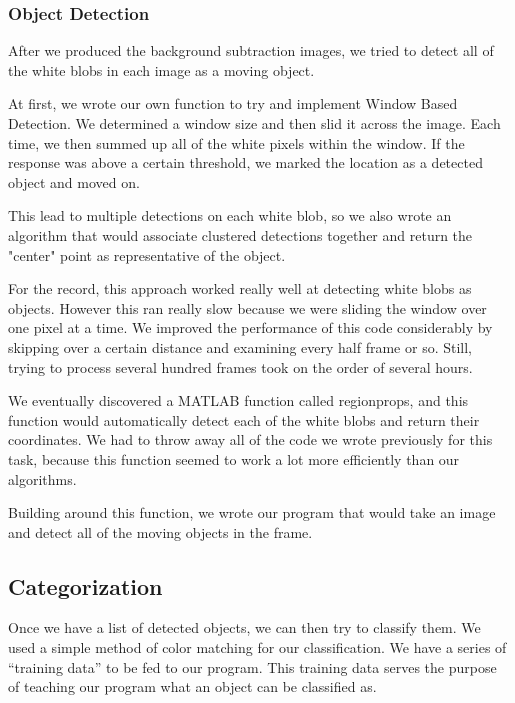 \documentclass[a4paper, 10pt, conference]{ieeeconf}      %
\begin{document}
\subsubsection{Object Detection}

After we produced the background subtraction images, we tried to detect all of the white blobs in each image as a moving object. \newline

At first, we wrote our own function to try and implement Window Based Detection. We determined a window size and then slid it across the image. Each time, we then summed up all of the white pixels within the window. If the response was above a certain threshold, we marked the location as a detected object and moved on. \newline

This lead to multiple detections on each white blob, so we also wrote an algorithm that would associate clustered detections together and return the "center" point as representative of the object. \newline

For the record, this approach worked really well at detecting white blobs as objects. However this ran really slow because we were sliding the window over one pixel at a time. We improved the performance of this code considerably by skipping over a certain distance and examining every half frame or so. Still, trying to process several hundred frames took on the order of several hours. \newline

We eventually discovered a MATLAB function called regionprops, and this function would automatically detect each of the white blobs and return their coordinates. We had to throw away all of the code we wrote previously for this task, because this function seemed to work a lot more efficiently than our algorithms. \newline

Building around this function, we wrote our program that would take an image and detect all of the moving objects in the frame. \newline


\subsection{Categorization}

Once we have a list of detected objects, we can then try to classify them. We used a simple method of color matching for our classification. We have a series of “training data” to be fed to our program. This training data serves the purpose of teaching our program what an object can be classified as. \newline
\end{document}
